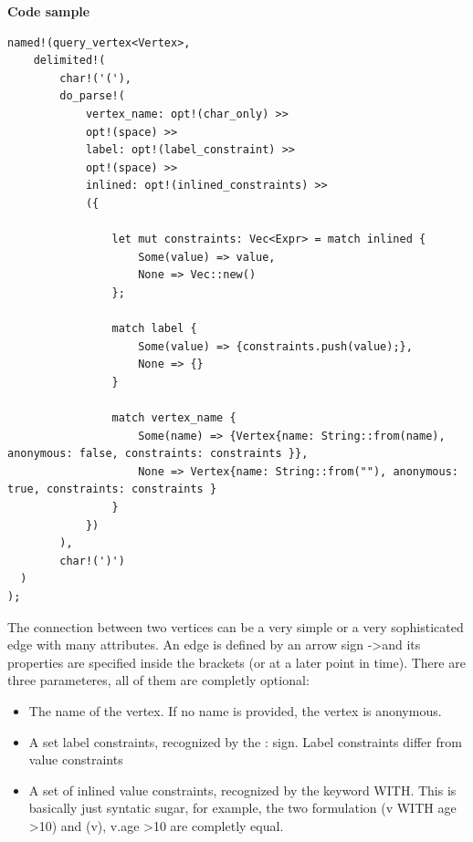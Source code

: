 \documentclass[11pt,singlecolumn]{scrartcl}
\begin{document}
\textbf{Code sample}
\begin{lstlisting}
named!(query_vertex<Vertex>,
    delimited!(
        char!('('),
        do_parse!(
            vertex_name: opt!(char_only) >> 
            opt!(space) >>
            label: opt!(label_constraint) >>
            opt!(space) >>
            inlined: opt!(inlined_constraints) >>
            ({
                
                let mut constraints: Vec<Expr> = match inlined {
                    Some(value) => value,
                    None => Vec::new()
                };

                match label {
                    Some(value) => {constraints.push(value);},
                    None => {}
                }

                match vertex_name {
                    Some(name) => {Vertex{name: String::from(name), anonymous: false, constraints: constraints }},
                    None => Vertex{name: String::from(""), anonymous: true, constraints: constraints }
                }
            })                
        ),
        char!(')')
  )
);
 \end{lstlisting} 
 
 The connection between two vertices can be a very simple or a very sophisticated edge with many attributes. An edge is defined by an arrow sign -\textgreater and its properties are specified inside the brackets (or at a later point in time). There are three parameteres, all of them are completly optional:\\
 \begin{itemize}
 \item The name of the vertex. If no name is provided, the vertex is anonymous.
 \item A set label constraints, recognized by the : sign. Label constraints differ from value constraints
 \item A set of inlined value constraints, recognized by the keyword WITH. This is basically just syntatic sugar, for example, the two formulation (v WITH age \textgreater 10) and (v), v.age \textgreater 10 are completly equal.
 \end{itemize}
 
\end{document}
